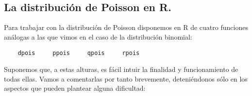 \documentclass[10pt,a4paper]{article}\usepackage[]{graphicx}\usepackage[]{color}
\begin{document}
\subsection{La distribución de Poisson en R.}

Para trabajar con la distribución de Poisson disponemos en R de cuatro funciones análogas a las que vimos en el caso de la distribución binomial:
    \begin{center}
    \begin{minipage}{10cm}
    \begin{verbatim}
    dpois     ppois     qpois     rpois
    \end{verbatim}
    \end{minipage}
    \end{center}
Suponemos que, a estas alturas, es fácil intuir la finalidad y funcionamiento de todas ellas. Vamos a comentarlas por tanto brevemente, deteniéndonos sólo en los aspectos que pueden plantear alguna dificultad:
\end{document}
